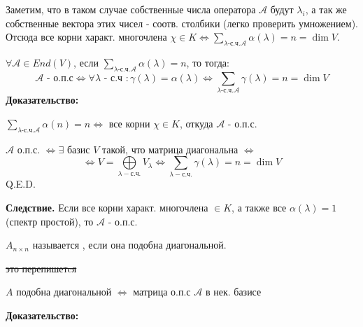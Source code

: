 Заметим, что в таком случае  собственные числа  оператора $\mathcal{A}$ будут $\lambda_i$, а так же собственные вектора этих чисел - соотв. столбики (легко проверить умножением). Отсюда  все корни характ. многочлена  $\chi \in K \Leftrightarrow \sum\limits_{\lambda \text{-с.ч.} \mathcal{A}}\alpha(\lambda) = n = \dim V$.




$\forall \mathcal{A} \in End(V)$, если  $\sum\limits_{\lambda \text{-с.ч.} \mathcal{A}} \alpha(\lambda)= n$, то тогда:
$$\mathcal{A} \text{ - о.п.с} \Leftrightarrow \forall\lambda \text{ - с.ч }: \gamma(\lambda) = \alpha(\lambda) \Leftrightarrow \sum\limits_{\lambda \text{-с.ч.} \mathcal{A}}\gamma(\lambda) = n = \dim V$$
\textbf{Доказательство:}

$ \sum\limits_{\lambda \text{-с.ч.} \mathcal{A}} \alpha(n) = n \Leftrightarrow$ все корни $\chi \in K$, откуда $\mathcal{A}$ -  о.п.с.

$\mathcal{A}$ о.п.с. $\Leftrightarrow \exists$ базис $V$ такой, что матрица диагональна $\Leftrightarrow$ $$\Leftrightarrow V = \bigoplus\limits_{\lambda - \text{с.ч.}}V_{\lambda} \Leftrightarrow \sum\limits_{\lambda - \text{с.ч.}}\gamma(\lambda) = n =\dim V$$
\hfill Q.E.D.

\textbf{Следствие.} Если все корни характ. многочлена $\in K$, а также все $\alpha(\lambda)=1$ (спектр простой), то $\mathcal{A}$ - о.п.с.

 $A_{n\times n}$ называется , если  она подобна диагональной.


\sout{это перепишетcя}

$A$ подобна диагональной $\Leftrightarrow$ матрица о.п.с $\mathcal{A}$ в нек. базисе

\textbf{Доказательство:}

